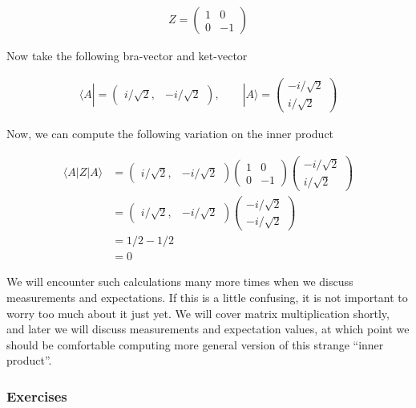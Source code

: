 \documentclass[11pt]{article}
\begin{document}
\begin{align} Z = \begin{pmatrix}
1 & 0 \\
0 & -1
\end{pmatrix} \end{align}

Now take the following bra-vector and ket-vector

\begin{align} \langle A| = \begin{pmatrix}
i/\sqrt{2}, & -i/\sqrt{2}
\end{pmatrix}, \quad \quad |A\rangle = \begin{pmatrix}
-i/\sqrt{2} \\ i/\sqrt{2}
\end{pmatrix} \end{align}

    Now, we can compute the following variation on the inner product

\begin{align}
\langle A| Z |A \rangle &= 
\begin{pmatrix}
i/\sqrt{2}, & -i/\sqrt{2}
\end{pmatrix}
\begin{pmatrix}
1 & 0 \\
0 & -1
\end{pmatrix}
\begin{pmatrix}
-i/\sqrt{2} \\ i/\sqrt{2}
\end{pmatrix} \\
&= \begin{pmatrix}
i/\sqrt{2}, & -i/\sqrt{2}
\end{pmatrix}
\begin{pmatrix}
-i/\sqrt{2} \\ -i/\sqrt{2}
\end{pmatrix} \\
&= 1/2 - 1/2 \\
&= 0
\end{align}

We will encounter such calculations many more times when we discuss
measurements and expectations. If this is a little confusing, it is not
important to worry too much about it just yet. We will cover matrix
multiplication shortly, and later we will discuss measurements and
expectation values, at which point we should be comfortable computing
more general version of this strange ``inner product''.

    \hypertarget{exercises}{%
\subsubsection{Exercises}\label{exercises}}
\end{document}
